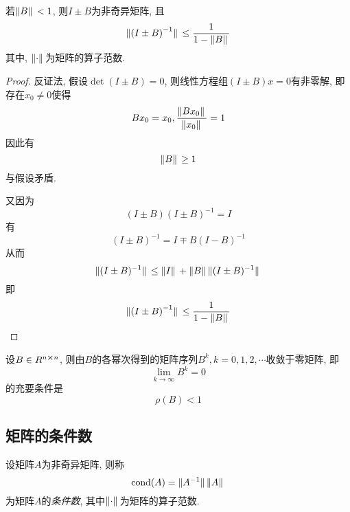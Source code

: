 \begin{theorem}
    若$\norm*{B}<1$, 则$I\pm B$为非奇异矩阵, 且
    \begin{equation*}
        \norm*{\left(I\pm B\right)^{-1}}\le\frac{1}{1-\norm*{B}}
    \end{equation*}
    其中, $\norm*{\cdot}$为矩阵的算子范数.
\end{theorem}

\begin{proof}
    反证法, 假设$\det{(I\pm B)}=0$, 则线性方程组$(I\pm B)x=0$有非零解, 即存在$x_0\ne 0$使得
    \begin{equation*}
        Bx_0=x_0, \frac{\norm*{Bx_0}}{\norm*{x_0}}=1
    \end{equation*}
    因此有
    \begin{equation*}
        \norm*{B}\ge 1
    \end{equation*}
    与假设矛盾.

    又因为
    \begin{equation*}
        (I\pm B)(I\pm B)^{-1}=I
    \end{equation*}
    有
    \begin{equation*}
        (I\pm B)^{-1}=I\mp B(I-B)^{-1}
    \end{equation*}
    从而
    \begin{equation*}
        \norm*{(I\pm B)^{-1}}\le\norm*{I}+\norm*{B}\norm*{(I\pm B)^{-1}}
    \end{equation*}
    即
    \begin{equation*}
        \norm*{\left(I\pm B\right)^{-1}}\le\frac{1}{1-\norm*{B}}
    \end{equation*}
\end{proof}

\begin{theorem}
    设$B\in R^{n\cross n}$, 则由$B$的各幂次得到的矩阵序列$B^k, k=0,1,2,\cdots$收敛于零矩阵, 即
    \begin{equation*}
        \lim\limits_{k\to\infty}B^k=0
    \end{equation*}
    的充要条件是
    \begin{equation*}
        \rho(B)<1
    \end{equation*}
\end{theorem}

\subsection{矩阵的条件数}

\begin{definition}
    设矩阵$A$为非奇异矩阵, 则称
    \begin{equation*}
        \text{cond}(A)=\norm*{A^{-1}}\norm*{A}
    \end{equation*}
    为矩阵$A$的\emph{条件数}, 其中$\norm*{\cdot}$为矩阵的算子范数.
\end{definition}


